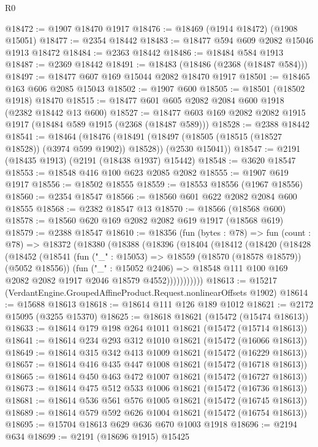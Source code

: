 \begin{lexlean}{R0}
\begin{coremodule}
@18472 := @1907 @18470 @1917
@18476 := @18469 (@1914 @18472) (@1908 @15051)
@18477 := @2354 @18442
@18483 := @18477 @594 @609 @2082 @15046 @1913 @18472
@18484 := @2363 @18442
@18486 := @18484 @584 @1913
@18487 := @2369 @18442
@18491 := @18483 (@18486 (@2368 (@18487 @584)))
@18497 := @18477 @607 @169 @15044 @2082 @18470 @1917
@18501 := @18465 @163 @606 @2085 @15043
@18502 := @1907 @600
@18505 := @18501 (@18502 @1918) @18470
@18515 := @18477 @601 @605 @2082 @2084 @600 @1918 (@2382 @18442 @13 @600)
@18527 := @18477 @603 @169 @2082 @2082 @1915 @1917 (@18484 @589 @1915 (@2368 (@18487 @589)))
@18528 := @2388 @18442
@18541 := @18464
    (@18476
      (@18491 (@18497 (@18505 (@18515 (@18527 @18528)) (@3974 @599 @1902)) @18528))
      (@2530 @15041))
@18547 := @2191 (@18435 @1913) (@2191 (@18438 @1937) @15442)
@18548 := @3620 @18547
@18553 := @18548 @416 @100 @623 @2085 @2082
@18555 := @1907 @619 @1917
@18556 := @18502 @18555
@18559 := @18553 @18556 (@1967 @18556)
@18560 := @2354 @18547
@18566 := @18560 @601 @622 @2082 @2084 @600 @18555
@18568 := @2382 @18547 @13
@18570 := @18566 (@18568 @600)
@18578 := @18560 @620 @169 @2082 @2082 @619 @1917 (@18568 @619)
@18579 := @2388 @18547
@18610 := @18356
    (fun (bytes : @78) =>
    fun (count : @78) =>
    @18372
      (@18380
        (@18388
          (@18396
            (@18404
              (@18412
                (@18420
                  (@18428
                    (@18452
                      (@18541
                        (fun ("_" : @15053) => @18559 (@18570 (@18578 @18579)) (@5052 @18556))
                        (fun ("_" : @15052 @2406) =>
                        @18548 @111 @100 @169 @2082 @2082 @1917 @2046 @18579 @4552)))))))))))
@18613 := @15217 (VerdantEngine.GroupedAffineProduct.Request.nonlinearOffsets @1902)
@18614 := @15688 @18613
@18618 := @18614 @111 @126 @189 @1012
@18621 := @2172 @15095 (@3255 @15370)
@18625 := @18618 @18621 (@15472 (@15474 @18613))
@18633 := @18614 @179 @198 @264 @1011 @18621 (@15472 (@15714 @18613))
@18641 := @18614 @234 @293 @312 @1010 @18621 (@15472 (@16066 @18613))
@18649 := @18614 @315 @342 @413 @1009 @18621 (@15472 (@16229 @18613))
@18657 := @18614 @416 @435 @447 @1008 @18621 (@15472 (@16718 @18613))
@18665 := @18614 @450 @463 @472 @1007 @18621 (@15472 (@16727 @18613))
@18673 := @18614 @475 @512 @533 @1006 @18621 (@15472 (@16736 @18613))
@18681 := @18614 @536 @561 @576 @1005 @18621 (@15472 (@16745 @18613))
@18689 := @18614 @579 @592 @626 @1004 @18621 (@15472 (@16754 @18613))
@18695 := @15704 @18613 @629 @636 @670 @1003 @1918
@18696 := @2194 @634
@18699 := @2191 (@18696 @1915) @15425

\end{coremodule}
\end{lexlean}
